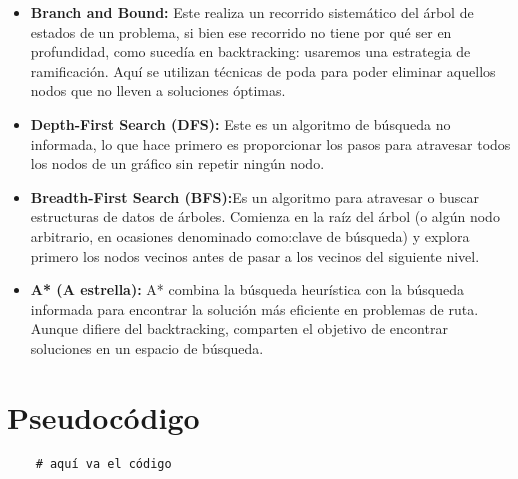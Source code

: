 \documentclass[a4paper,12pt]{article}
\begin{document}
\begin{itemize}
    \item \textbf{Branch and Bound:} Este realiza un recorrido sistemático del árbol de 
    estados de un problema, si bien ese recorrido no tiene por qué ser en profundidad, 
    como sucedía en backtracking: usaremos una estrategia de ramificación. 
    Aquí se utilizan técnicas de poda para poder eliminar aquellos nodos que no 
    lleven a soluciones óptimas.
    
    \item \textbf{Depth-First Search (DFS):} Este es un algoritmo de búsqueda no 
    informada, lo que hace primero es proporcionar los pasos para atravesar todos los 
    nodos de un gráfico sin repetir ningún nodo.
    
    \item \textbf{Breadth-First Search (BFS):}Es un algoritmo para atravesar o buscar 
    estructuras de datos de árboles. Comienza en la raíz del árbol (o algún nodo 
    arbitrario, en ocasiones denominado como:clave de búsqueda) y explora primero 
    los nodos vecinos antes de pasar a los vecinos del siguiente nivel.
    
    \item \textbf{A* (A estrella):} A* combina la búsqueda heurística con la búsqueda 
    informada para encontrar la solución más eficiente en problemas de ruta. Aunque 
    difiere del backtracking, comparten el objetivo de encontrar soluciones en un 
    espacio de búsqueda.
\end{itemize}


\section{Pseudocódigo}

\begin{verbatim}
    # aquí va el código 
\end{verbatim}
\end{document}
